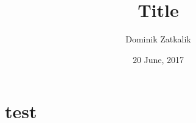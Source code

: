 \documentclass{beamer}
\title[Title]{Title}
\author{Dominik Zatkalik}
\institute{
    \inst{1}
     SvF STU BA, KMaDG
}
\date{20 June, 2017}
\begin{document}
\frame{\titlepage}


\section{test}
\end{document}
